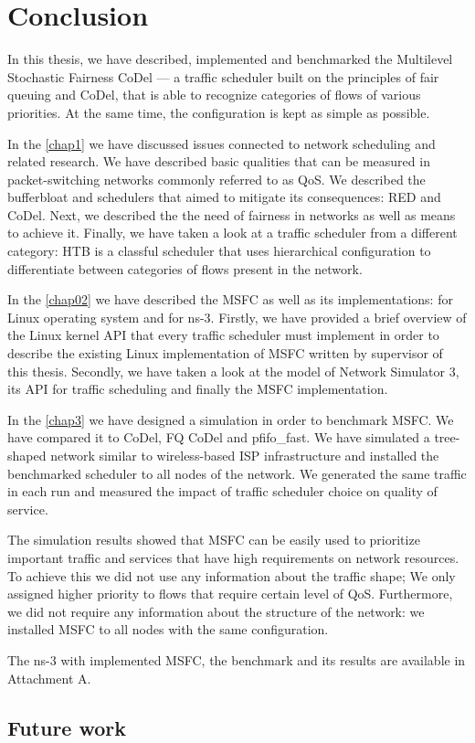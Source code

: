 \chapter*{Conclusion}

In this thesis, we have described, implemented and benchmarked the Multilevel Stochastic Fairness CoDel --- a traffic scheduler built on the principles of fair queuing and CoDel, that is able to recognize categories of flows of various priorities. At the same time, the configuration is kept as simple as possible. 

In the \autoref{chap1} we have discussed issues connected to network scheduling and related research. We have described basic qualities that can be measured in packet-switching networks commonly referred to as QoS. We described the bufferbloat and schedulers that aimed to mitigate its consequences: RED and CoDel. Next, we described the the need of fairness in networks as well as means to achieve it. Finally, we have taken a look at a traffic scheduler from a different category: HTB is a classful scheduler that uses hierarchical configuration to differentiate between categories of flows present in the network.

In the \autoref{chap02} we have described the MSFC as well as its implementations: for Linux operating system and for ns-3. Firstly, we have provided a brief overview of the Linux kernel API that every traffic scheduler must implement in order to describe the existing Linux implementation of MSFC written by supervisor of this thesis. Secondly, we have taken a look at the model of Network Simulator 3, its API for traffic scheduling and finally the MSFC implementation.

In the \autoref{chap3} we have designed a simulation in order to benchmark MSFC. We have compared it to CoDel, FQ CoDel and pfifo\_fast. We have simulated a tree-shaped network similar to wireless-based ISP infrastructure and installed the benchmarked scheduler to all nodes of the network. We generated the same traffic in each run and measured the impact of traffic scheduler choice on quality of service.

The simulation results showed that MSFC can be easily used to prioritize important traffic and services that have high requirements on network resources. To achieve this we did not use any information about the traffic shape; We only assigned higher priority to flows that require certain level of QoS. Furthermore, we did not require any information about the structure of the network: we installed MSFC to all nodes with the same configuration.

The ns-3 with implemented MSFC, the benchmark and its results are available in Attachment A.

\section*{Future work}

